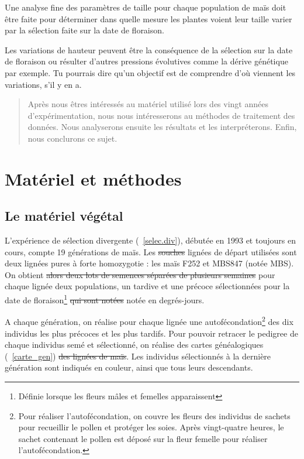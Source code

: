 \documentclass[12pt,a4paper]{report}
\newcommand{\com}[1]{{\noindent  \color{red}#1}}
\begin{document}
			Une analyse fine des paramètres de taille pour chaque population de maïs doit être faite pour déterminer dans quelle mesure les plantes voient leur taille varier par la sélection faite sur la date de floraison.
			
\com{Les variations de hauteur peuvent \^etre la conséquence de la sélection sur la date de floraison ou résulter d'autres pressions évolutives comme la dérive génétique par exemple. Tu pourrais dire qu'un objectif est de comprendre d'où viennent les variations, s'il y en a.}			
			
	\begin{quotation}
		Après nous êtres intéressés au matériel utilisé lors des vingt années d'expérimentation, nous nous intéresserons au méthodes de traitement des données. Nous analyserons ensuite les résultats et les interpréterons. Enfin, nous conclurons ce sujet.
	\end{quotation}
	
	
	\chapter{Matériel et méthodes}
		
		\section{Le matériel végétal}
			
			L'expérience de sélection divergente (~\ref{selec.div}), débutée en 1993 et toujours en cours, compte 19 générations de maïs. Les \sout{souches} \com{lignées} de départ utilisées sont deux lignées pures à forte homozygotie : les maïs F252 et MBS847 (notée MBS). On obtient \sout{alors deux lots de semences  séparées de plusieurs semaines} \com{pour chaque lignée deux populations, un tardive et une précoce sélectionnées} pour la date de floraison\footnote{Définie lorsque les fleurs mâles et femelles apparaissent} \sout{qui sont notées} \com{notée} en degrés-jours.
			
			A chaque génération, on réalise pour chaque lignée une autofécondation\footnote{Pour réaliser l'autofécondation, on couvre les fleurs des individus de sachets pour recueillir le pollen et protéger les soies. Après vingt-quatre heures, le sachet contenant le pollen est déposé sur la fleur femelle pour réaliser l'autofécondation.} des dix individus les plus précoces et les plus tardifs. Pour pouvoir retracer le pedigree de chaque individus semé et sélectionné, on réalise des cartes généalogiques (~\ref{carte_gen}) \sout{des lignées de maïs}. Les individus sélectionnés à la dernière génération sont indiqués en couleur, ainsi que tous leurs descendants. \cite{goossens93}
			
\end{document}
